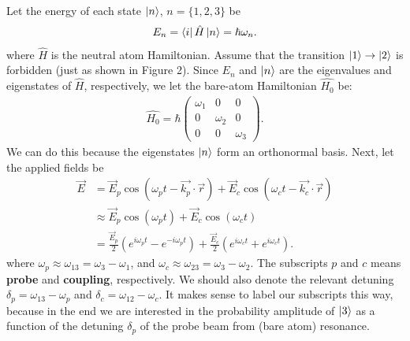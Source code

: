 \documentclass{article}
\theoremstyle{definition}
\begin{document}
Let the energy of each state $\ket{n}$, $n=\{1,2,3\}$ be
\begin{align}
E_n = \bra{i}\hat{H}\ket{n} = \hbar\omega_n.
\end{align}
where $\hat{H}$ is the neutral atom Hamiltonian. Assume that the transition $\ket{1} \rightarrow \ket{2}$ is forbidden (just as shown in Figure 2). Since $E_n$ and $\ket{n}$ are the eigenvalues and eigenstates of $\hat{H}$, respectively, we let the bare-atom Hamiltonian $\hat{H_0}$ be:
\begin{align}
\hat{H_0}=
\hbar\begin{pmatrix}
\omega_1 & 0 & 0\\
0 & \omega_2 & 0\\
0 & 0 & \omega_3
\end{pmatrix}.
\end{align}
We can do this because the eigenstates $\ket{n}$ form an orthonormal basis. Next, let the applied fields be 
\begin{align}
\vec{E} &= \vec{E}_p \cos(\omega_p t - \vec{k_p}\cdot\vec{r}) +
\vec{E}_c \cos(\omega_c t - \vec{k_c}\cdot\vec{r}) \nonumber\\
&\approx \vec{E}_p \cos(\omega_p t) +
\vec{E}_c \cos(\omega_c t)\nonumber\\
&= \frac{\vec{E}_p}{2}\left(e^{i\omega_pt} - e^{-i\omega_pt} \right) + \frac{\vec{E}_c}{2}\left( e^{i\omega_ct} + e^{i\omega_ct}\right). 
\end{align}
where $\omega_p \approx \omega_{13} = \omega_3 - \omega_1$, and $\omega_c \approx \omega_{23} = \omega_3 - \omega_2$. The subscripts $p$ and $c$ means \textbf{probe} and \textbf{coupling}, respectively. We should also denote the relevant detuning $\delta_p = \omega_{13} - \omega_p$ and $\delta_c = \omega_{12} - \omega_c$. It makes sense to label our subscripts this way, because in the end we are interested in the probability amplitude of $\ket{3}$ as a function of the detuning $\delta_p$ of the probe beam from (bare atom) resonance.\\
\end{document}
